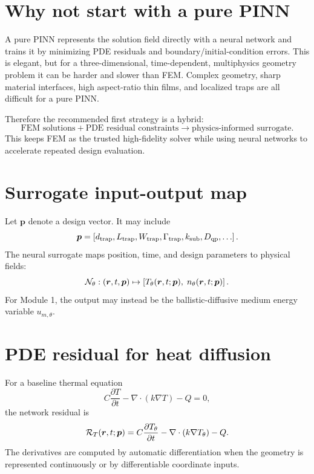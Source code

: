\documentclass[11pt]{article}
\begin{document}
\section{Why not start with a pure PINN}
A pure PINN represents the solution field directly with a neural network and trains it by minimizing PDE residuals and boundary/initial-condition errors. This is elegant, but for a three-dimensional, time-dependent, multiphysics geometry problem it can be harder and slower than FEM. Complex geometry, sharp material interfaces, high aspect-ratio thin films, and localized traps are all difficult for a pure PINN.

Therefore the recommended first strategy is a hybrid:
\begin{equation}
\text{FEM solutions} + \text{PDE residual constraints} \longrightarrow \text{physics-informed surrogate}.
\end{equation}
This keeps FEM as the trusted high-fidelity solver while using neural networks to accelerate repeated design evaluation.

\section{Surrogate input-output map}
Let $\bm{p}$ denote a design vector. It may include
\begin{equation}
\bm{p}=\left[d_{\mathrm{trap}},L_{\mathrm{trap}},W_{\mathrm{trap}},\Gamma_{\mathrm{trap}},k_{\mathrm{sub}},D_{\mathrm{qp}},\ldots\right].
\end{equation}
The neural surrogate maps position, time, and design parameters to physical fields:
\begin{equation}
\mathcal{N}_\theta:(\bm{r},t,\bm{p})\mapsto\left[T_\theta(\bm{r},t;\bm{p}),\;n_\theta(\bm{r},t;\bm{p})\right].
\end{equation}
For Module 1, the output may instead be the ballistic-diffusive medium energy variable $u_{m,\theta}$.

\section{PDE residual for heat diffusion}
For a baseline thermal equation
\begin{equation}
C\frac{\partial T}{\partial t}-\nabla\cdot(k\nabla T)-Q=0,
\end{equation}
the network residual is
\begin{equation}
\mathcal{R}_T(\bm{r},t;\bm{p})
=C\frac{\partial T_\theta}{\partial t}
-\nabla\cdot(k\nabla T_\theta)-Q.
\end{equation}
The derivatives are computed by automatic differentiation when the geometry is represented continuously or by differentiable coordinate inputs.
\end{document}
